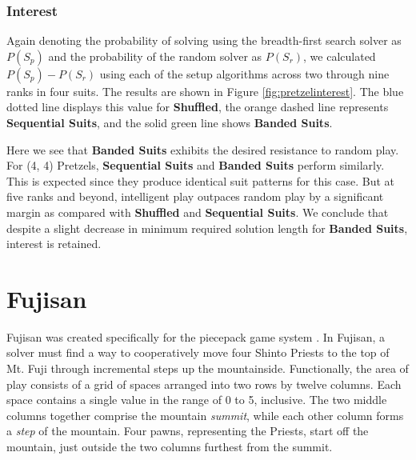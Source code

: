 \documentclass[journal]{IEEEtran}
\begin{document}
%

%

%


%
%
%
%
%

\subsubsection{Interest}

Again denoting the probability of solving using the breadth-first search solver as $P(S_p)$ and the probability of the random solver as $P(S_r)$, we calculated $P(S_p) - P(S_r)$ using each of the setup algorithms across two through nine ranks in four suits. The results are shown in Figure \ref{fig:pretzelinterest}. The blue dotted line displays this value for \textbf{Shuffled}, the orange dashed line represents \textbf{Sequential Suits}, and the solid green line shows \textbf{Banded Suits}.

Here we see that \textbf{Banded Suits} exhibits the desired resistance to random play. For (4, 4) Pretzels, \textbf{Sequential Suits} and \textbf{Banded Suits} perform similarly. This is expected since they produce identical suit patterns for this case. But at five ranks and beyond, intelligent play outpaces random play by a significant margin as compared with \textbf{Shuffled} and \textbf{Sequential Suits}. We conclude that despite a slight decrease in minimum required solution length for \textbf{Banded Suits}, interest is retained.


%

\section{Fujisan}
\noindent
Fujisan was created specifically for the piecepack game system \cite{GAMESYSTEM}. In Fujisan, a solver must find a way to cooperatively move four Shinto Priests to the top of Mt. Fuji through incremental steps up the mountainside. Functionally, the area of play consists of a grid of spaces arranged into two rows by twelve columns. Each space contains a single value in the range of 0 to 5, inclusive. The two middle columns together comprise the mountain {\it summit}, while each other column forms a {\it step} of the mountain. Four pawns, representing the Priests, start off the mountain, just outside the two columns furthest from the summit.
\end{document}
